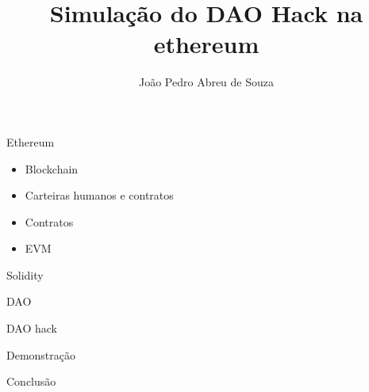 \documentclass{beamer}
\title{Simulação do DAO Hack na ethereum}
\author{João Pedro Abreu de Souza}
\begin{document}
\begin{frame}[plain]
    \maketitle
\end{frame}
\begin{frame}{Ethereum}
\begin{itemize}
	\item Blockchain
	\item Carteiras humanos e contratos
	\item Contratos
	\item EVM
\end{itemize}
\end{frame}
\begin{frame}{Solidity}
\end{frame}
\begin{frame}{DAO}
\end{frame}
\begin{frame}{DAO hack}
\end{frame}
\begin{frame}{Demonstração}
\end{frame}
\begin{frame}{Conclusão}
\end{frame}
\end{document}
